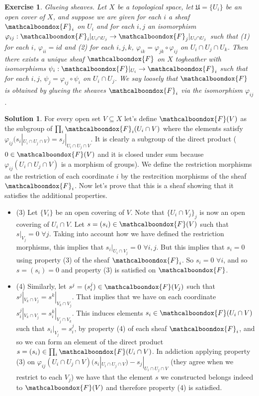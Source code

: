 \documentclass[12pt]{article}
\newtheorem{ex}{Exercise}[section]
\theoremstyle{definition}
\newtheorem*{sol}{Solution}
\newcommand{\sF}{\ensuremath{\mathcalboondox{F}}}
\begin{document}
\begin{ex}
	Glueing sheaves. Let $X$ be a topological space, let $\mathfrak{U} = \{U_i\}$ be an open cover of $X$, and suppose we are given for each $i$ a sheaf $\sF_i$ on $U_i$ and for each $i,j$ an isomorphism $\varphi_{ij}: \sF_i|_{U_i \cap U_j} \to \sF_j|_{U_i \cap U_j}$ such that (1) for each $i$, $\varphi_{ii} = id$ and (2) for each $i,j,k$, $\varphi_{ik} = \varphi_{jk} \circ \varphi_{ij}$ on $U_i \cap U_j \cap U_k$. Then there exists a unique sheaf $\sF$ on $X$ togheather with isomorphisms $\psi_i: \sF|_{U_i} \to \sF_i$ such that for each $i,j, \, \psi_j = \varphi_{ij} \circ \psi_i$ on $U_i \cap U_j$. We say loosely that $\sF$ is obtained by glueing the sheaves $\sF_i$ via the isomorphism $\varphi_{ij}$.
\end{ex}

\begin{sol}
	For every open set $V \subseteq X$ let's define $\sF(V)$ as the subgroup of $\prod_{i} \sF_i(U_i \cap V)$ where the elements satisfy $\varphi_{ij}(s_i|_{U_i \cap U_j \cap V}) = s_j|_{U_i \cap U_j \cap V}$. It is clearly a subgroup of the direct product ($0 \in \sF(V)$ and it is closed under sum because $\varphi_{ij}(U_i \cap U_j \cap V)$ is a morphism of groups). We define the restriction morphisms as the restriction of each coordinate $i$ by the restrcition morphisms of the sheaf $\sF_i$. Now let's prove that this is a sheaf showing that it satisfies the additional properties. 

	\begin{itemize}
		\item (3) Let $\{V_i\}$ be an open covering of $V$. Note that $\{U_i \cap V_j\}_j$ is now an open covering of $U_i \cap V$. Let $s = (s_i) \in \sF(V)$ such that $s|_{V_j} = 0 \, \, \forall j$. Taking into account how we have defined the restriction morphisms, this implies that $s_i|_{U_i \cap V_j} = 0 \, \, \forall i,j$. But this implies that $s_i = 0$ using property (3) of the sheaf $\sF_i$. So $s_i = 0 \, \, \forall i$, and so $s = (s_i) = 0$ and property (3) is satisfied on $\sF$. 

		\item (4) Similarly, let $s^j = (s_i^j) \in \sF(V_j)$ such that $s^j|_{V_k \cap V_j} = s^k|_{V_k \cap V_j}$. That implies that we have on each coordinate $s^j_i|_{V_k \cap V_j} = s^k_i|_{V_j \cap V_k}$. This induces elements $s_i \in \sF(U_i \cap V)$ such that $s_i|_{V_j} = s_i^j$, by property (4) of each sheaf $\sF_i$, and so we can form an element of the direct product $s = (s_i) \in \prod_{i} \sF(U_i \cap V)$. In addiction applying property (3) on $\varphi_{ij}(U_i \cap U_j \cap V)(s_i|_{U_i \cap U_j \cap V}) - s_j|_{U_i \cap U_j \cap V}$ (they agree when we restrict to each $V_j$) we have that the element $s$ we constructed belongs indeed to $\sF(V)$ and therefore property (4) is satisfied. 
	\end{itemize}


\end{sol}
\end{document}
